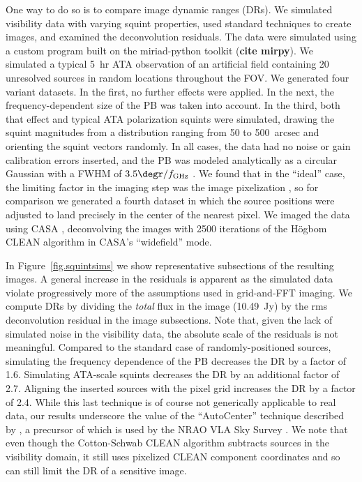 \documentclass[preprint]{aastex}
\begin{document}
One way to do so is to compare image dynamic ranges (DRs). We
simulated visibility data with varying squint properties, used
standard techniques to create images, and examined the deconvolution
residuals. The data were simulated using a custom program built on the
\textsf{miriad-python} toolkit (\textbf{cite mirpy}). We simulated a
typical 5~hr ATA observation of an artificial field containing 20
unresolved sources in random locations throughout the FOV. We
generated four variant datasets. In the first, no further effects were
applied. In the next, the frequency-dependent size of the PB was taken
into account. In the third, both that effect and typical ATA
polarization squints were simulated, drawing the squint magnitudes
from a distribution ranging from 50 to 500~arcsec and orienting the
squint vectors randomly. In all cases, the data had no noise or gain
calibration errors inserted, and the PB was modeled analytically as a
circular Gaussian with a FWHM of $3.5\degr / f_\textrm{GHz}$
\citep{Harp2011}. We found that in the ``ideal'' case, the limiting
factor in the imaging step was the image pixelization \citep{cu08}, so
for comparison we generated a fourth dataset in which the source
positions were adjusted to land precisely in the center of the nearest
pixel. We imaged the data using CASA \citep{thecasa}, deconvolving the
images with 2500 iterations of the H\"ogbom CLEAN algorithm in CASA's
``widefield'' mode.

In Figure~\ref{fig.squintsims} we show representative subsections of
the resulting images. A general increase in the residuals is apparent
as the simulated data violate progressively more of the assumptions
used in grid-and-FFT imaging. We compute DRs by dividing the
\textit{total} flux in the image (10.49~Jy) by the rms deconvolution
residual in the image subsections. Note that, given the lack of
simulated noise in the visibility data, the absolute scale of the
residuals is not meaningful. Compared to the standard case of
randomly-positioned sources, simulating the frequency dependence of
the PB decreases the DR by a factor of 1.6. Simulating ATA-scale
squints decreases the DR by an additional factor of 2.7. Aligning the
inserted sources with the pixel grid increases the DR by a factor of
2.4. While this last technique is of course not generically applicable
to real data, our results underscore the value of the ``AutoCenter''
technique described by \citet{cu08}, a precursor of which is used by
the NRAO VLA Sky Survey \citep{thenvss}. We note that even though the
Cotton-Schwab CLEAN algorithm \citep{cbb99} subtracts sources in the
visibility domain, it still uses pixelized CLEAN component coordinates
and so can still limit the DR of a sensitive image.
\end{document}
